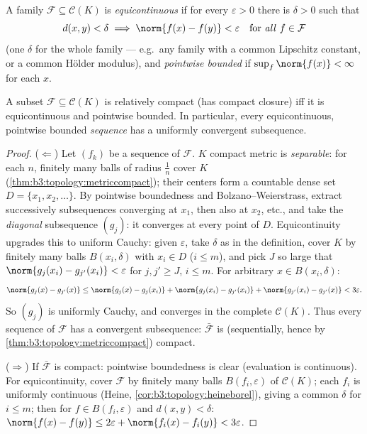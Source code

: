 \begin{definition}\label{def:b3:complete:equicontinuous}
A family $\mathcal F \subseteq \mathcal C(K)$ is
\emph{equicontinuous} if for every
$\varepsilon > 0$ there is $\delta > 0$ such that
\[
d(x, y) < \delta \implies \norm{f(x) - f(y)} < \varepsilon
\quad\text{for \emph{all} } f \in \mathcal F
\]
(one $\delta$ for the whole family --- e.g.\ any family with a
common Lipschitz constant, or a common H\"older modulus), and
\emph{pointwise bounded} if $\sup_{f}\norm{f(x)} < \infty$ for
each $x$.
\end{definition}

\begin{theorem}\label{thm:b3:complete:ascoli}
A subset $\mathcal F \subseteq \mathcal C(K)$ is relatively
compact (has compact closure) iff it is equicontinuous and
pointwise bounded. In particular, every equicontinuous,
pointwise bounded \emph{sequence} has a uniformly convergent
subsequence.
\end{theorem}

\begin{proof}
($\Leftarrow$) Let $(f_k)$ be a sequence of $\mathcal F$. $K$
compact metric is \emph{separable}: for each $n$, finitely many
balls of radius $\frac1n$ cover $K$
(\cref{thm:b3:topology:metriccompact}); their centers form a
countable dense set $D = \{x_1, x_2, \dots\}$. By pointwise
boundedness and Bolzano--Weierstrass, extract successively
subsequences converging at $x_1$, then also at $x_2$, etc., and
take the \emph{diagonal} subsequence $(g_j)$: it converges at
every point of $D$. Equicontinuity upgrades this to uniform
Cauchy: given $\varepsilon$, take $\delta$ as in the
definition, cover $K$ by finitely many balls $B(x_i, \delta)$
with $x_i \in D$ ($i \leq m$), and pick $J$ so large that
$\norm{g_j(x_i) - g_{j'}(x_i)} < \varepsilon$ for $j, j' \geq
J$, $i \leq m$. For arbitrary $x \in B(x_i, \delta)$:
\[
\norm{g_j(x) - g_{j'}(x)}
\leq \norm{g_j(x) - g_j(x_i)} + \norm{g_j(x_i) - g_{j'}(x_i)}
+ \norm{g_{j'}(x_i) - g_{j'}(x)} < 3\varepsilon .
\]
So $(g_j)$ is uniformly Cauchy, and converges in the complete
$\mathcal C(K)$. Thus every sequence of $\mathcal F$ has a
convergent subsequence: $\bar{\mathcal F}$ is (sequentially,
hence by \cref{thm:b3:topology:metriccompact}) compact.

($\Rightarrow$) If $\bar{\mathcal F}$ is compact: pointwise
boundedness is clear (evaluation is continuous). For
equicontinuity, cover $\mathcal F$ by finitely many balls
$B(f_i, \varepsilon)$ of $\mathcal C(K)$; each $f_i$ is
uniformly continuous (Heine,
\cref{cor:b3:topology:heineborel}), giving a common $\delta$
for $i \leq m$; then for $f \in B(f_i, \varepsilon)$ and $d(x,y)
< \delta$: $\norm{f(x)-f(y)} \leq 2\varepsilon +
\norm{f_i(x)-f_i(y)} < 3\varepsilon$.
\end{proof}

